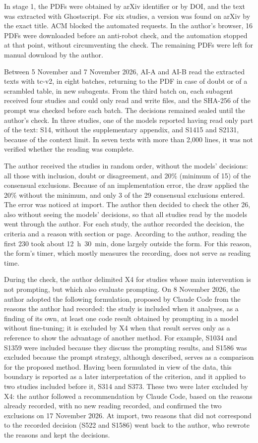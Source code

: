 In stage 1, the PDFs were obtained by arXiv identifier or by DOI, and the text was extracted with Ghostscript.
For six studies, a version was found on arXiv by the exact title. ACM blocked the automated requests. In the
author's browser, 16 PDFs were downloaded before an anti-robot check, and the automation stopped at that point,
without circumventing the check. The remaining PDFs were left for manual download by the author.

Between 5 November and 7 November 2026, AI-A and AI-B read the extracted texts with tc-v2, in eight batches, returning to the PDF in case
of doubt or of a scrambled table, in new subagents. From the third batch on, each subagent received four
studies and could only read and write files, and the SHA-256 of the prompt was checked before each batch. The decisions remained sealed until the
author's check. In three studies, one of the models reported having read only part of the text: S14, without the supplementary
appendix, and S1415 and S2131, because of the context limit. In seven texts with more than 2,000 lines, it was not verified
whether the reading was complete.

The author received the studies in random order, without the models' decisions: all those with inclusion,
doubt or disagreement, and 20\% (minimum of 15) of the consensual exclusions. Because of an implementation error, the draw
applied the 20\% without the minimum, and only 3 of the 29 consensual exclusions entered. The error was noticed at import.
The author then decided to check the other 26, also without seeing the models' decisions, so that all studies
read by the models went through the author. For each study, the author recorded the decision, the criteria and a reason with
section or page. According to the author, reading the first 230 took about 12~h~30~min, done largely outside
the form. For this reason, the form's timer, which mostly measures the recording, does not serve as reading time.

During the check, the author delimited X4 for studies whose main intervention is not prompting, but which
also evaluate prompting. On 8 November 2026, the author adopted the following formulation, proposed by Claude Code from the
reasons the author had recorded: the study is included when it analyses, as a finding of its own, at least one code
result obtained by prompting in a model without fine-tuning; it is excluded by X4 when that result serves only as a
reference to show the advantage of another method. For example, S1034 and S1359 were included because they discuss
the prompting results, and S1586 was excluded because the prompt strategy, although described, serves as a
comparison for the proposed method. Having been formulated in view of the data, this boundary is reported as a
later interpretation of the criterion, and it applied to two studies included before it, S314 and S373. These two
were later excluded by X4: the author followed a recommendation by Claude Code, based on the reasons already
recorded, with no new reading recorded, and confirmed the two exclusions on 17 November 2026. At
import, two reasons that did not correspond to the recorded decision (S522 and S1586) went back to the author, who
rewrote the reasons and kept the decisions.

